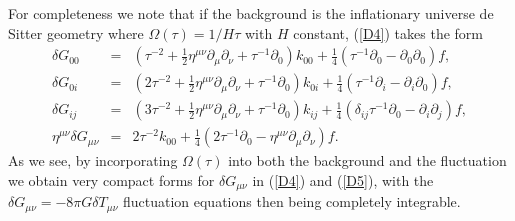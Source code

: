 For completeness we note that if the background is the inflationary universe de Sitter geometry where $\Omega(\tau)=1/H\tau$ with $H$ constant, (\ref{D4}) takes the form
%
\begin{eqnarray}
\delta G_{00}&=&
(\tau^{-2} + \tfrac{1}{2} \eta^{\mu \nu} \partial_{\mu} \partial_{\nu} + \tau^{-1} \partial_{0}) k_{00} + \tfrac{1}{4} (\tau^{-1} \partial_{0} -   \partial_{0} \partial_{0}) f,
\nonumber\\
\delta G_{0i}&=&
(2 \tau^{-2} + \tfrac{1}{2} \eta^{\mu \nu} \partial_{\mu} \partial_{\nu} + \tau^{-1} \partial_{0}) k_{0i} + \tfrac{1}{4} ( \tau^{-1} \partial_{i} -  \partial_{i} \partial_{0}) f,
\nonumber\\
\delta G_{ij}&=&
(3 \tau^{-2} + \tfrac{1}{2} \eta^{\mu \nu} \partial_{\mu} \partial_{\nu} + \tau^{-1} \partial_{0}) k_{ij} + \tfrac{1}{4} (\delta_{ij} \tau^{-1} \partial_{0} -   \partial_{i} \partial_{j}) f,
\nonumber\\
\eta^{\mu\nu}\delta G_{\mu\nu}&=&2\tau^{-2}k_{00}+ \tfrac{1}{4}  (2\tau^{-1}\partial_{0} -\eta^{\mu\nu}\partial_{\mu}\partial_{\nu}) f.
\label{D5}
\end{eqnarray}
%
As we see, by incorporating $\Omega(\tau)$ into both the background and the fluctuation we obtain very compact forms for $\delta G_{\mu\nu}$  in (\ref{D4}) and (\ref{D5}), with the $\delta G_{\mu\nu}=-8\pi G \delta T_{\mu\nu}$ fluctuation equations then being completely integrable.

